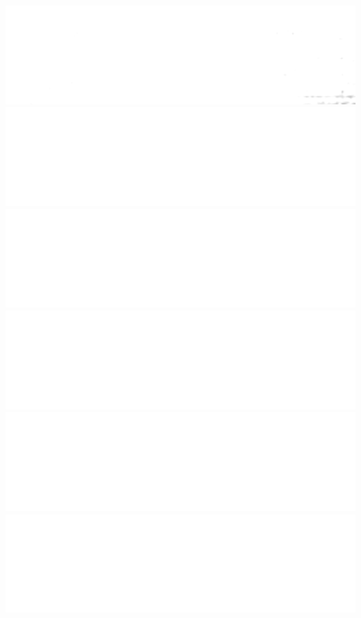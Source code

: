 \documentclass{beamer}
\begin{document}
\begin{frame}
        \includegraphics[height=0.023\textheight]{spatial-denoised/wavelet_den_37.png}
        \includegraphics[height=0.023\textheight]{spatial-denoised/wavelet_den_38.png}
        \includegraphics[height=0.023\textheight]{spatial-denoised/wavelet_den_39.png}
        \includegraphics[height=0.023\textheight]{spatial-denoised/wavelet_den_40.png}
        \includegraphics[height=0.023\textheight]{spatial-denoised/wavelet_den_41.png}
        \includegraphics[height=0.023\textheight]{spatial-denoised/wavelet_den_42.png}

\end{frame}
\end{document}
